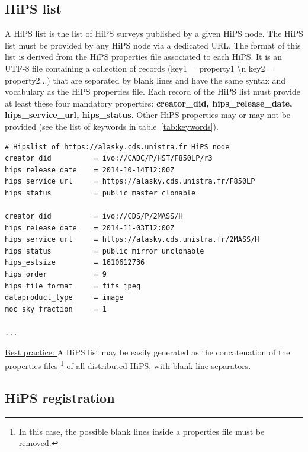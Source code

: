 \documentclass[11pt,a4paper]{ivoa}
\begin{document}
\subsection{HiPS list}
\label{sec:hipslist}

A HiPS list is the list of HiPS surveys published by a given HiPS node. The HiPS list must be provided by any HiPS node via a dedicated URL.
The format of this list is derived from the HiPS properties file associated to each HiPS.  It is an UTF-8 file containing a collection of records (key1 = property1 \textbackslash n key2 = property2...) that are separated by blank lines and have the same syntax and vocabulary as the HiPS properties file. 
Each record of the HiPS list must provide at least these four mandatory properties: {\bf creator\_did, hips\_release\_date, hips\_service\_url, hips\_status}. Other HiPS properties may or may not be provided (see the list of keywords in table~\ref{tab:keywords}).

\begin{tcolorbox}[title=Example of a HiPS list]
\begin{verbatim}
# Hipslist of https://alasky.cds.unistra.fr HiPS node
creator_did          = ivo://CADC/P/HST/F850LP/r3
hips_release_date    = 2014-10-14T12:00Z
hips_service_url     = https://alasky.cds.unistra.fr/F850LP
hips_status          = public master clonable

creator_did          = ivo://CDS/P/2MASS/H
hips_release_date    = 2014-11-03T12:00Z
hips_service_url     = https://alasky.cds.unistra.fr/2MASS/H
hips_status          = public mirror unclonable
hips_estsize         = 1610612736
hips_order           = 9
hips_tile_format     = fits jpeg
dataproduct_type     = image
moc_sky_fraction     = 1

...
\end{verbatim}
\end{tcolorbox}

\begin{tcolorbox}
\underline{Best practice: } A HiPS list may be easily generated as the concatenation of the properties files  \footnote{In this case, the possible blank lines inside a properties file must be removed.} of all distributed HiPS, with blank line separators.
\end{tcolorbox}

\subsection{HiPS registration}
\end{document}
